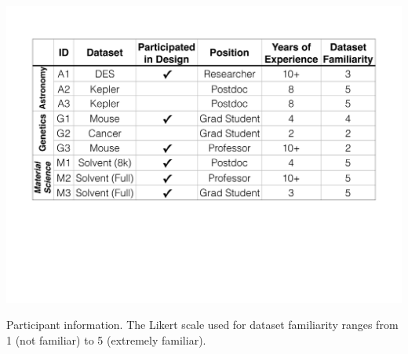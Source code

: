   \begin{table}[hb!]
    \centering
    \includegraphics[width=0.9\linewidth]{figures/participant_info.pdf}
    \caption{Participant information. The Likert scale used for dataset familiarity ranges from 1 (not familiar) to 5 (extremely familiar).}
    \label{participants}
    \vspace*{-10pt}
  \end{table}
